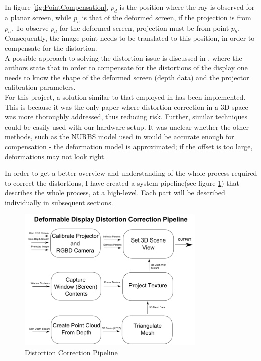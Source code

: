 \documentclass[]{article}
\begin{document}
In figure \ref{fig:PointCompensation}, $p_{d}$ is the position where the ray is observed for a planar screen, while $p_{c}$ is that of the deformed screen, if the projection is from $p_{a}$. To observe $p_{d}$ for the deformed screen, projection must be from point $p_{b}$. Consequently, the image point needs to be translated to this position, in order to compensate for the distortion.\\

A possible approach to solving the distortion issue is discussed in \cite{watanabe08}, where the authors state that in order to compensate for the distortions of the display one needs to know the shape of the deformed screen (depth data) and the projector calibration parameters. \\

For this project, a solution similar to that employed in \cite{watanabe08} has been implemented. This is because it was the only paper where distortion correction in a 3D space was more thoroughly addressed, thus reducing risk. Further, similar techniques could be easily used with our hardware setup. It was unclear whether the other methods, such as the NURBS model used in \cite{steimle13} would be accurate enough for compensation - the deformation model is approximated; if the offset is too large, deformations may not look right.

In order to get a better overview and understanding of the whole process required to correct the distortions, I have created a system pipeline(see figure \ref{fig:Pipeline}) that describes the whole process, at a high-level. Each part will be described individually in subsequent sections.

\begin{figure}[hbtp]
    \centering
    \includegraphics[width=0.8\textwidth]{figures/DeformableDisplayPipeline.PNG}
    \caption{Distortion Correction Pipeline}
    \label{fig:Pipeline}
\end{figure}
\newpage
\end{document}
